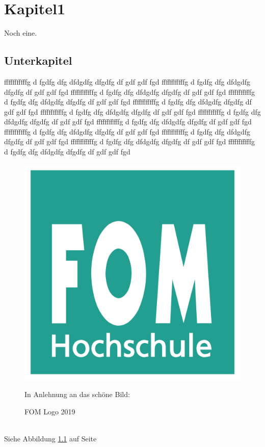\chapter{Kapitel1}
\blindtext{}\autocite{elk} Noch eine.\autocite[12]{elk}

\section{Unterkapitel}
\blindtext{}
\blindtext{}
fffffffffffg d fgdfg dfg dfdgdfg dfgdfg df gdf gdf fgd
fffffffffffg d fgdfg dfg dfdgdfg dfgdfg df gdf gdf fgd
fffffffffffg d fgdfg dfg dfdgdfg dfgdfg df gdf gdf fgd
fffffffffffg d fgdfg dfg dfdgdfg dfgdfg df gdf gdf fgd
fffffffffffg d fgdfg dfg dfdgdfg dfgdfg df gdf gdf fgd
fffffffffffg d fgdfg dfg dfdgdfg dfgdfg df gdf gdf fgd
fffffffffffg d fgdfg dfg dfdgdfg dfgdfg df gdf gdf fgd
fffffffffffg d fgdfg dfg dfdgdfg dfgdfg df gdf gdf fgd
fffffffffffg d fgdfg dfg dfdgdfg dfgdfg df gdf gdf fgd
fffffffffffg d fgdfg dfg dfdgdfg dfgdfg df gdf gdf fgd
fffffffffffg d fgdfg dfg dfdgdfg dfgdfg df gdf gdf fgd
fffffffffffg d fgdfg dfg dfdgdfg dfgdfg df gdf gdf fgd
\begin{figure}[H] 
   \centering 
   \begin{minipage}{8cm} 
   \caption{FOM Logo 2019} 
   \label{fig:fom_logo} 
   \includegraphics[width=\textwidth]{Abbildungen/fom_logo.png} 
   \par\smallskip 
   In Anlehnung an das schöne Bild: \cite[12]{elk}
   \end{minipage} 
\end{figure} 

\blindtext[12]{}\\
Siehe Abbildung \ref{fig:fom_logo} auf Seite \pageref{fig:fom_logo}